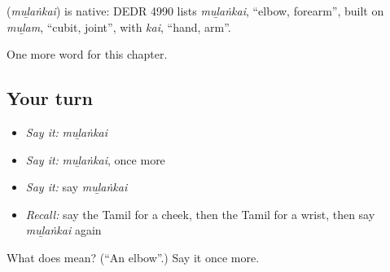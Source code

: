 \begin{cousinweb}
\textbf{} (\emph{muḻaṅkai}) is native: DEDR 4990 lists \emph{muḻaṅkai}, \textquotedblleft{}elbow, forearm\textquotedblright{}, built on \emph{muḻam}, \textquotedblleft{}cubit, joint\textquotedblright{}, with \emph{kai}, \textquotedblleft{}hand, arm\textquotedblright{}.
\end{cousinweb}

\begin{grammarlens}[title={What you've built}]
One more word for this chapter.
\end{grammarlens}

\subsection*{Your turn}
\begin{itemize}
\raggedright
  \item \emph{Say it:} \emph{muḻaṅkai}
  \item \emph{Say it:} \emph{muḻaṅkai}, once more
  \item \emph{Say it:} say \emph{muḻaṅkai}
  \item \emph{Recall:} say the Tamil for a cheek, then the Tamil for a wrist, then say \emph{muḻaṅkai} again
\end{itemize}

\begin{tcolorbox}[breakable,colback=teal!4,colframe=teal!35!black,title={Before you move on}]
What does  mean? (\textquotedblleft{}An elbow\textquotedblright{}.) Say it once more.
\end{tcolorbox}
